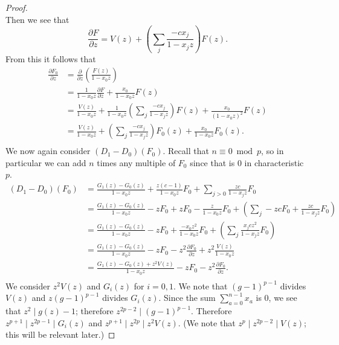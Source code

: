 \documentclass{amsart}
\numberwithin{equation}{section}
\theoremstyle{definition}
\begin{document}
\begin{proof}
\[\]
Then we see that 
\[
\frac{\partial F}{\partial z}=V(z)+\left(\sum_j \frac{-cx_j}{1-x_jz}\right)F(z).
\]
From this it follows that
\begin{align*}
\frac{\partial F_0}{\partial z} &= \frac{\partial}{\partial z}\left(\frac{F(z)}{1-x_0z}\right)\\
&=\frac{1}{1-x_0z} \frac{\partial F}{\partial z}+\frac{x_0}{1-x_0z} F(z)\\
&=\frac{V(z)}{1-x_0z}+\frac{1}{1-x_0z}\left(\sum_j \frac{-cx_j}{1-x_jz}\right)F(z)+\frac{x_0}{(1-x_0z)^2} F(z)\\
&=\frac{V(z)}{1-x_0z}+\left(\sum_j \frac{-cx_j}{1-x_jz}\right)F_0(z)+\frac{x_0}{1-x_0z} F_0(z).\\
\end{align*}
We now again consider $(D_1-D_0)(F_0)$. Recall that $n \equiv 0 \bmod p$, so in particular we can add $n$ times any multiple of $F_0$ since that is $0$ in characteristic $p$. 
\begin{align*}
(D_1-D_0)(F_0)&=\frac{G_1(z)-G_0(z)}{1-x_0z}+\frac{z(c-1)}{1-x_0z}F_0+\sum_{j>0} \frac{zc}{1-x_jz}F_0\\
&=\frac{G_1(z)-G_0(z)}{1-x_0z}-zF_0+zF_0-\frac{z}{1-x_0z}F_0+\left(\sum_{j} -zcF_0+\frac{zc}{1-x_jz}F_0\right)\\
&=\frac{G_1(z)-G_0(z)}{1-x_0z}-zF_0+\frac{-x_0z^2}{1-x_0z}F_0+\left(\sum_{j} \frac{x_jcz^2}{1-x_jz}F_0\right)\\
&=\frac{G_1(z)-G_0(z)}{1-x_0z}-zF_0-z^2\frac{\partial F_0}{\partial z}+z^2\frac{V(z)}{1-x_0z}\\
&=\frac{G_1(z)-G_0(z)+z^2V(z)}{1-x_0z}-zF_0-z^2\frac{\partial F_0}{\partial z}.\\
\end{align*}
We consider $z^2V(z)$ and $G_i(z)$ for $i=0,1$. We note that $(g-1)^{p-1}$ divides $V(z)$ and $z(g-1)^{p-1}$ divides $G_i(z)$. Since the sum $\sum_{a=0}^{n-1} x_a$ is $0$, we see that $z^2 \mid g(z)-1$; therefore $z^{2p-2} \mid (g-1)^{p-1}$. Therefore $z^{p+1} \mid z^{2p-1} \mid G_i(z)$ and $z^{p+1} \mid z^{2p} \mid z^2V(z)$. (We note that $z^p \mid z^{2p-2} \mid V(z)$; this will be relevant later.)


\end{proof}
\end{document}
